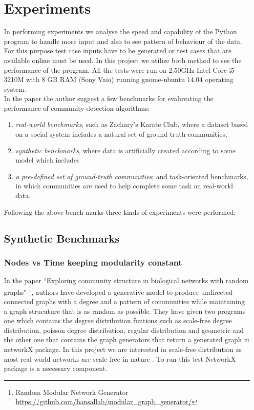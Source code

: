\section{Experiments}
In performing experiments we analyse the speed and capability of the Python program to handle more input and also to see pattern of behaviour of the data. For this purpose test case inputs have to be generated or test cases that are available online must be used. 
In this project we utilize both method to see the performance of the program. All the tests were run on 2.50GHz Intel Core i5-3210M with 8 GB RAM (Sony Vaio) running gnome-ubuntu 14.04 operating system. 
\\
In the paper \cite{benchmarking} the author suggest a few benchmarks for evaluvating the performance of community detection algorithms:
\begin{enumerate}
\item \textit{real-world benchmarks}, such as Zachary’s Karate Club, where a dataset based on a social system
includes a natural set of ground-truth communities;
\item \textit{synthetic benchmarks}, where data is artificially created according to some model which includes
\item \textit{a pre-defined set of ground-truth communities}; and
task-oriented benchmarks, in which communities are used to help complete some task on real-world
data.
\end{enumerate}
Following the above bench marks three kinds of experiments were performed:
\subsection{Synthetic Benchmarks}
\subsubsection{Nodes vs Time keeping modularity constant}
\par In the paper ``Exploring community structure in biological networks with random graphs" \cite{githubtest1} \footnote{Random Modular Network Generator \url{https://github.com/bansallab/modular_graph_generator/}}, authors have developed a generative model to produce undirected connected graphs with a degree and a pattern of communities while maintaining a graph strucuture that is as random as possible.  They have given two programs one which contains the degree distribution funtions such as scale-free degree  distribution, poisson degree distribution, regular distribution and geometric and the other one that contains the graph generators that return a generated graph in networkX package.  In this project we are interested in scale-free distribution as most real-world networks are scale free in nature \cite{scalefree}. To run this test NetworkX package is a necessary component. 

